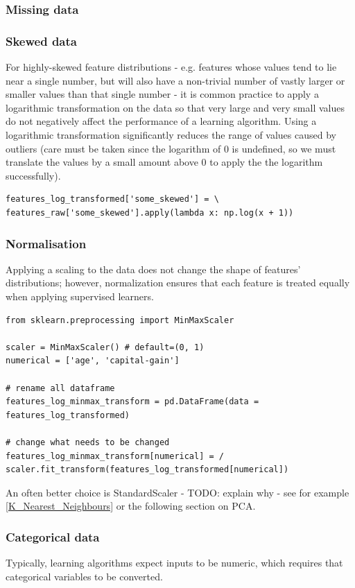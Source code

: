 \documentclass[11pt]{article}
\begin{document}
\subsubsection*{Missing data}

\subsubsection*{Skewed data}
For highly-skewed feature distributions - e.g. features whose values tend to lie near a single number, but will also have a non-trivial number of vastly larger or smaller values than that single number - it is common practice to apply a  logarithmic transformation on the data so that very large and very small values do not negatively affect the performance of a learning algorithm. Using a logarithmic transformation significantly reduces the range of values caused by outliers (care must be taken since the logarithm of 0 is undefined, so we must translate the values by a small amount above 0 to apply the the logarithm successfully).
\begin{lstlisting}
features_log_transformed['some_skewed'] = \
features_raw['some_skewed'].apply(lambda x: np.log(x + 1))
\end{lstlisting}

\subsubsection*{Normalisation}
Applying a scaling to the data does not change the shape of features' distributions; however, normalization ensures that each feature is treated equally when applying supervised learners.

\begin{lstlisting}
from sklearn.preprocessing import MinMaxScaler

scaler = MinMaxScaler() # default=(0, 1)
numerical = ['age', 'capital-gain']

# rename all dataframe
features_log_minmax_transform = pd.DataFrame(data = features_log_transformed)

# change what needs to be changed
features_log_minmax_transform[numerical] = /
scaler.fit_transform(features_log_transformed[numerical])
\end{lstlisting}

An often better choice is StandardScaler - TODO: explain why - see for example \ref{K_Nearest_Neighbours} or the following section on PCA. 

\subsubsection*{Categorical data}
Typically, learning algorithms expect inputs to be numeric, which requires that categorical variables to be converted. 
\end{document}
